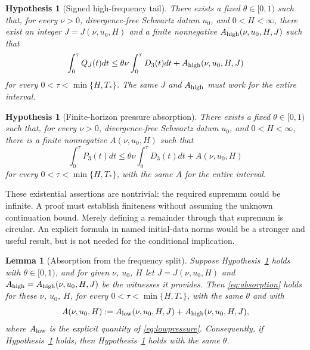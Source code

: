 \documentclass[11pt]{article}
\newtheorem{hypothesis}[theorem]{Hypothesis}
\newtheorem{lemma}[theorem]{Lemma}
\theoremstyle{definition}
\theoremstyle{plain}
\begin{document}
\begin{hypothesis}[Signed high-frequency tail]\label{hyp:highpressure}
There exists a fixed $\theta\in[0,1)$ such that, for every $\nu>0$,
divergence-free Schwartz datum $u_0$, and $0<H<\infty$, there exist an
integer $J=J(\nu,u_0,H)$ and a finite nonnegative
$A_{\rm high}(\nu,u_0,H,J)$ such that
\begin{equation}\label{eq:highpressure}
 \int_0^\tau Q_J(t)dt
 \leq\theta\nu\int_0^\tau D_3(t)dt
 +A_{\rm high}(\nu,u_0,H,J)
\end{equation}
for every $0<\tau<\min\{H,T_*\}$. The same $J$ and $A_{\rm high}$ must
work for the entire interval.
\end{hypothesis}

\begin{hypothesis}[Finite-horizon pressure absorption]\label{hyp:absorption}
There exists a fixed $\theta\in[0,1)$ such that, for every $\nu>0$,
divergence-free Schwartz datum $u_0$, and $0<H<\infty$, there is a finite
nonnegative $A(\nu,u_0,H)$ such that
\begin{equation}\label{eq:absorption}
 \int_0^\tau P_3(t)dt
 \leq\theta\nu\int_0^\tau D_3(t)dt+A(\nu,u_0,H)
\end{equation}
for every $0<\tau<\min\{H,T_*\}$, with the same $A$ for the entire interval.
\end{hypothesis}

These existential assertions are nontrivial: the required supremum could be
infinite. A proof must establish finiteness without assuming the unknown
continuation bound. Merely defining a remainder through that supremum is
circular. An explicit formula in named initial-data norms would be a stronger
and useful result, but is not needed for the conditional implication.

\begin{lemma}[Absorption from the frequency split]\label{lem:absorption-split}
Suppose Hypothesis~\ref{hyp:highpressure} holds with $\theta\in[0,1)$, and
for given $\nu$, $u_0$, $H$ let $J=J(\nu,u_0,H)$ and
$A_{\rm high}=A_{\rm high}(\nu,u_0,H,J)$ be the witnesses it provides.  Then
\eqref{eq:absorption} holds for these $\nu$, $u_0$, $H$, for every
$0<\tau<\min\{H,T_*\}$, with the same $\theta$ and with
\[
 A(\nu,u_0,H):=A_{\rm low}(\nu,u_0,H,J)+A_{\rm high}(\nu,u_0,H,J),
\]
where $A_{\rm low}$ is the explicit quantity of \eqref{eq:lowpressure}.
Consequently, if Hypothesis~\ref{hyp:highpressure} holds, then
Hypothesis~\ref{hyp:absorption} holds with the same $\theta$.
\end{lemma}
\end{document}
